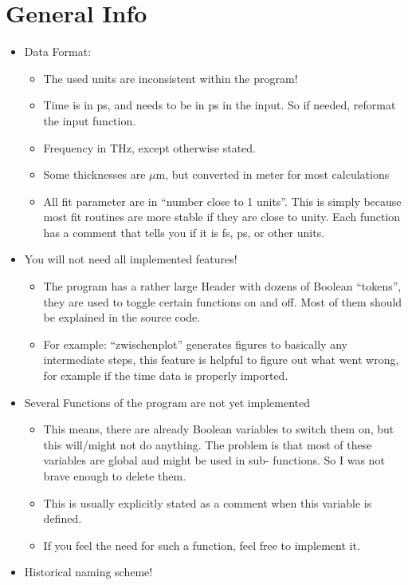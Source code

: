 \documentclass[12pt]{article}
\begin{document}
\section{General Info}
\begin{itemize}
	\item 	Data Format:
	\begin{itemize}
		\item 	The used units are inconsistent within the program! 
		\item	Time is in ps, and needs to be in ps in the input. So if needed, reformat the input function.
		\item	Frequency in THz, except otherwise stated.
		\item	Some thicknesses are $\mu$m, but converted in meter for most calculations
		\item	All fit parameter are in "`number close to 1 units"'. This is simply because most fit routines are more stable if they are close to unity. Each function has a comment that tells you if it is fs, ps, or other units. 
		\end{itemize}
	\item	You will not need all implemented features! 
	\begin{itemize}
		\item	The program has a rather large Header with dozens of Boolean "`tokens"', they are used to toggle certain functions on and off. Most of them should be explained in the source code. 
		\item	For example: "`zwischenplot"' generates figures to basically any intermediate steps, this feature is helpful to figure out what went wrong, for example if the time data is properly 			 	imported. 
	\end{itemize}
	\item	Several Functions of the program are not yet implemented
	\begin{itemize}
		\item	This means, there are already Boolean variables to switch them on, but this will/might not do anything. The problem is that most of these variables are global and might be used in sub-		functions. So I was not brave enough to delete them. 
		\item This is usually explicitly stated as a comment when this variable is defined. 
		\item	If you feel the need for such a function, feel free to implement it. 
	\end{itemize}
	\item	Historical naming scheme! 

\end{itemize}
\end{document}
